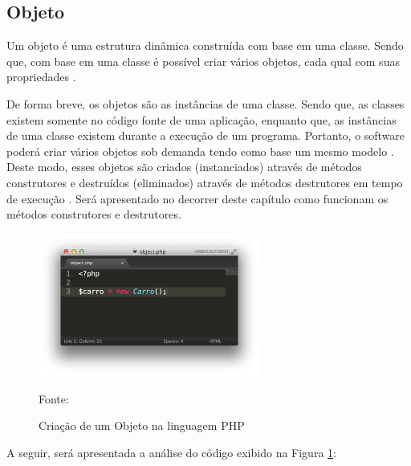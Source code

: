 \subsection{Objeto}

Um objeto é uma estrutura dinâmica construída com base em uma classe. Sendo que,
com base em uma classe é possível criar vários objetos, cada qual com suas
propriedades \cite{phpProgramandoComOrientacaoAObjetos}.

De forma breve, os objetos são as instâncias de uma classe. Sendo que, as
classes existem somente no código fonte de uma aplicação, enquanto que, as
instâncias de uma classe existem durante a execução de um programa. Portanto,
o software poderá criar vários objetos sob demanda tendo como base um mesmo
modelo \cite{ios7ProgrammingFundamentalsObjectiveCXcodeAndCocoaBasics}. Deste
modo, esses objetos são criados (instanciados) através de métodos construtores
e destruídos (eliminados) através de métodos destrutores em tempo de execução
\cite{umlEC++GuiaPraticoDeDesenvolvimentoOrientadoAObjeto}. Será apresentado no
decorrer deste capítulo como funcionam os métodos construtores e destrutores.

\begin{figure}[h!tb]
	\caption{Criação de um Objeto na linguagem PHP}
	\label{fig:objeto}

	\centering
	\includegraphics[width=0.65\textwidth]{images/object.png}

	\centering
	\footnotesize Fonte: \fonteOAutor
\end{figure}

\FloatBarrier 	%

A seguir, será apresentada a análise do código exibido na
Figura \ref{fig:objeto}:

